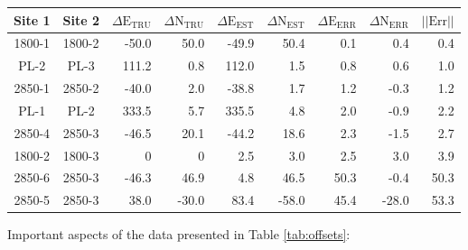 \begin{center}
	\begin{tabular}{|c|c|r|r|r|r|r|r|r|}
		\hline
		Site 1 & Site 2 & $\Delta \text{E}_\textrm{TRU}$ & $\Delta \text{N}_\textrm{TRU}$ & $\Delta \text{E}_\textrm{EST}$ & $\Delta \text{N}_\textrm{EST}$ & $\Delta \text{E}_\textrm{ERR} $ & $\Delta \text{N}_\textrm{ERR}$ & $||\text{Err}||$ \\ \hline
		1800-1 & 1800-2 & -50.0 & 50.0 & -49.9 & 50.4 & 0.1 & 0.4 & 0.4 \\ \hline
		PL-2 & PL-3 & 111.2 & 0.8 & 112.0 & 1.5 & 0.8 & 0.6 & 1.0 \\ \hline
		2850-1 & 2850-2 & -40.0 & 2.0 & -38.8 & 1.7 & 1.2 & -0.3 & 1.2 \\ \hline
		PL-1 & PL-2 & 333.5 & 5.7 & 335.5 & 4.8 & 2.0 & -0.9 & 2.2 \\ \hline
		2850-4 & 2850-3 & -46.5 & 20.1 & -44.2 & 18.6 & 2.3 & -1.5 & 2.7 \\ \hline
		1800-2 & 1800-3 & 0 & 0 & 2.5 & 3.0 & 2.5 & 3.0 & 3.9 \\ \hline \hline
		2850-6 & 2850-3 & -46.3 & 46.9 & 4.8 & 46.5 & 50.3 & -0.4 & 50.3 \\ \hline
		2850-5 & 2850-3 & 38.0 & -30.0 & 83.4 & -58.0 & 45.4 & -28.0 & 53.3 \\ \hline
	\end{tabular}
	
	\label{tab:offsets} 
\end{center}

\noindent Important aspects of the data presented in Table \ref{tab:offsets}:

